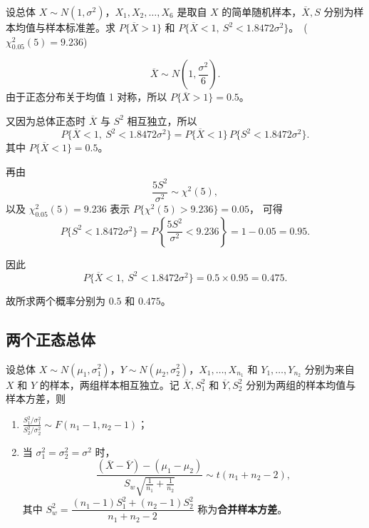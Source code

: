 ﻿\documentclass[lang=cn,11pt]{elegantbook}
\begin{document}
\begin{exercise}\label{exer:6-xbar-s2-prob}
设总体 \(X \sim N(1, \sigma^2)\)，\(X_1, X_2, \dots, X_6\) 是取自 \(X\) 的简单随机样本，\(\overline{X}, S\) 分别为样本均值与样本标准差。求 \(P\{\overline{X} > 1\}\) 和 \(P\{\overline{X} < 1,\ S^2 < 1.8472\sigma^2\}\)。\ (\(\chi^2_{0.05}(5) = 9.236\))
\end{exercise}
\begin{solution}
\[
\overline{X}\sim N\!\left(1,\frac{\sigma^2}{6}\right).
\]
由于正态分布关于均值 1 对称，所以 \(P\{\overline{X}>1\}=0.5\)。

又因为总体正态时 \(\overline{X}\) 与 \(S^2\) 相互独立，所以
\[
P\{\overline{X} < 1,\ S^2 < 1.8472\sigma^2\} = P\{\overline{X} < 1\}\,P\{S^2 < 1.8472\sigma^2\}.
\]
其中 \(P\{\overline{X}<1\}=0.5\)。

再由
\[
\frac{5S^2}{\sigma^2}\sim\chi^2(5),
\]
以及 \(\chi^2_{0.05}(5)=9.236\) 表示 \(P\{\chi^2(5)>9.236\}=0.05\)，
可得
\[
P\{S^2 < 1.8472\sigma^2\} = P\!\left\{\frac{5S^2}{\sigma^2} < 9.236\right\} = 1 - 0.05 = 0.95.
\]

因此
\[
P\{\overline{X} < 1,\ S^2 < 1.8472\sigma^2\}=0.5\times 0.95=0.475.
\]

故所求两个概率分别为 \(0.5\) 和 \(0.475\)。
\end{solution}


\subsection{两个正态总体}

\begin{theorem}[双正态总体抽样分布] \label{thm:normal-two}
设总体 \(X \sim N(\mu_1, \sigma_1^2)\)，\(Y \sim N(\mu_2, \sigma_2^2)\)，\(X_1, \dots, X_{n_1}\) 和 \(Y_1, \dots, Y_{n_2}\) 分别为来自 \(X\) 和 \(Y\) 的样本，两组样本相互独立。记 \(\overline{X}, S_1^2\) 和 \(\overline{Y}, S_2^2\) 分别为两组的样本均值与样本方差，则
\begin{enumerate}
    \item \(\displaystyle\frac{S_1^2/\sigma_1^2}{S_2^2/\sigma_2^2} \sim F(n_1-1, n_2-1)\)；
    \item 当 \(\sigma_1^2 = \sigma_2^2 = \sigma^2\) 时，
    \[
    \frac{(\overline{X}-\overline{Y})-(\mu_1-\mu_2)}{S_w\sqrt{\frac{1}{n_1}+\frac{1}{n_2}}} \sim t(n_1+n_2-2),
    \]
    其中 \(S_w^2 = \dfrac{(n_1-1)S_1^2+(n_2-1)S_2^2}{n_1+n_2-2}\) 称为\textbf{合并样本方差}。
\end{enumerate}
\end{theorem}
\end{document}
